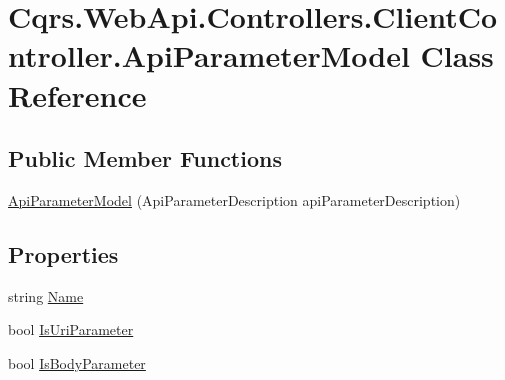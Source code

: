 \hypertarget{classCqrs_1_1WebApi_1_1Controllers_1_1ClientController_1_1ApiParameterModel}{}\section{Cqrs.\+Web\+Api.\+Controllers.\+Client\+Controller.\+Api\+Parameter\+Model Class Reference}
\label{classCqrs_1_1WebApi_1_1Controllers_1_1ClientController_1_1ApiParameterModel}
\subsection*{Public Member Functions}
\begin{DoxyCompactItemize}
\item 
\hyperlink{classCqrs_1_1WebApi_1_1Controllers_1_1ClientController_1_1ApiParameterModel_a10222cdb87160250e4722834d8ebda3b_a10222cdb87160250e4722834d8ebda3b}{Api\+Parameter\+Model} (Api\+Parameter\+Description api\+Parameter\+Description)
\end{DoxyCompactItemize}
\subsection*{Properties}
\begin{DoxyCompactItemize}
\item 
string \hyperlink{classCqrs_1_1WebApi_1_1Controllers_1_1ClientController_1_1ApiParameterModel_a0677b50dfb8a3f7b2379d1af3424c7e7_a0677b50dfb8a3f7b2379d1af3424c7e7}{Name}
\item 
bool \hyperlink{classCqrs_1_1WebApi_1_1Controllers_1_1ClientController_1_1ApiParameterModel_a2c3f5b3bab3b0a77d49339496ba7c1c5_a2c3f5b3bab3b0a77d49339496ba7c1c5}{Is\+Uri\+Parameter}
\item 
bool \hyperlink{classCqrs_1_1WebApi_1_1Controllers_1_1ClientController_1_1ApiParameterModel_a1eda14fd918860c32db2a2ff168d6ad2_a1eda14fd918860c32db2a2ff168d6ad2}{Is\+Body\+Parameter}
\end{DoxyCompactItemize}


